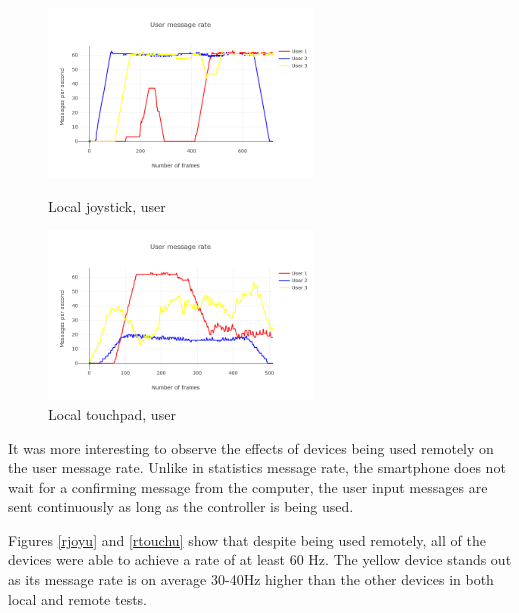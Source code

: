 \documentclass{l4proj}
\begin{document}
\begin{figure}[h!]
    \centering
    \begin{minipage}{0.45\textwidth}
        \centering
        \includegraphics[width=7cm]{./images/ljoyumess.png} %
        \caption{Local joystick, user}
        \label{ljoyu}
    \end{minipage}\hfill
    \begin{minipage}{0.45\textwidth}
        \centering
        \includegraphics[width=7cm]{./images/ltouchumess.png} %
        \caption{Local touchpad, user}
        \label{ltouchu}
    \end{minipage}
\end{figure}

It was more interesting to observe the effects of devices being used remotely on the user message rate. Unlike in statistics message rate, the smartphone does not wait for a confirming message from the computer, the user input messages are sent continuously as long as the controller is being used. \par

Figures \ref{rjoyu} and \ref{rtouchu} show that despite being used remotely, all of the devices were able to achieve a rate of at least 60 Hz. The yellow device stands out as its message rate is on average 30-40Hz higher than the other devices in both local and remote tests. \par
\end{document}
